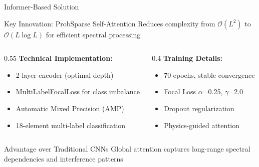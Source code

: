 \documentclass{beamer}
\begin{document}
\begin{frame}{Informer-Based Solution}
  \begin{block}{Key Innovation: ProbSparse Self-Attention}
    Reduces complexity from \(\mathcal{O}(L^2)\) to \(\mathcal{O}(L \log L)\) for efficient spectral processing
  \end{block}
  
  \vspace{0.5em}
  
  \begin{columns}[T]
    \begin{column}{0.55\textwidth}
      \textbf{Technical Implementation:}
      \begin{itemize}
        \item 2-layer encoder (optimal depth)
        \item MultiLabelFocalLoss for class imbalance
        \item Automatic Mixed Precision (AMP)
        \item 18-element multi-label classification
      \end{itemize}
    \end{column}
    \begin{column}{0.4\textwidth}
      \textbf{Training Details:}
      \begin{itemize}
        \item 70 epochs, stable convergence
        \item Focal Loss $\alpha$=0.25, $\gamma$=2.0
        \item Dropout regularization
        \item Physics-guided attention
      \end{itemize}
    \end{column}
  \end{columns}
  
  \vspace{0.5em}
  \begin{exampleblock}{Advantage over Traditional CNNs}
    Global attention captures long-range spectral dependencies and interference patterns
  \end{exampleblock}
\end{frame}
\end{document}
